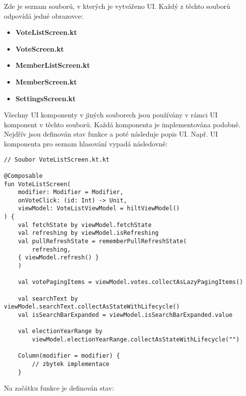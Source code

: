 \noindent Zde je seznam souborů, v kterých je vytvářeno UI. Každý z těchto souborů odpovídá jedné obrazovce:

\begin{itemize}
	\item \textbf{VoteListScreen.kt}
	\item \textbf{VoteScreen.kt}
	\item \textbf{MemberListScreen.kt}
	\item \textbf{MemberScreen.kt}
	\item \textbf{SettingsScreen.kt}
\end{itemize}

\noindent Všechny UI komponenty v jiných souborech jsou používány v rámci UI komponent v těchto souborů. Každá komponenta je implementována podobně. Nejdřív jsou definován stav funkce \linebreak a poté následuje popis UI. Např. UI komponenta pro seznam hlasování vypadá následovně:

\begin{lstlisting}[caption={Komponenta pro seznam hlasování}, tabsize=2]
// Soubor VoteListScreen.kt.kt
	
@Composable
fun VoteListScreen(
	modifier: Modifier = Modifier,
	onVoteClick: (id: Int) -> Unit,
	viewModel: VoteListViewModel = hiltViewModel()
) {
	val fetchState by viewModel.fetchState
	val refreshing by viewModel.isRefreshing
	val pullRefreshState = rememberPullRefreshState(
		refreshing,
	{ viewModel.refresh() }
	)
	
	val votePagingItems = viewModel.votes.collectAsLazyPagingItems()
	
	val searchText by viewModel.searchText.collectAsStateWithLifecycle()
	val isSearchBarExpanded = viewModel.isSearchBarExpanded.value
	
	val electionYearRange by 
		viewModel.electionYearRange.collectAsStateWithLifecycle("")
	
	Column(modifier = modifier) {
		// zbytek implementace
	}
\end{lstlisting}

\noindent Na začátku funkce je definován stav:

